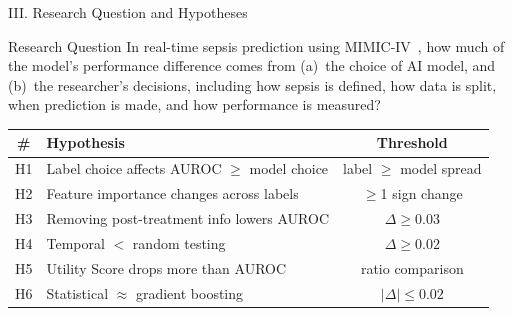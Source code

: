 \documentclass[aspectratio=169,10pt]{beamer}
\newcommand{\tablestyle}{%
  \renewcommand{\arraystretch}{1.2}%
  \small%
}
\begin{document}
\begin{frame}{III. Research Question and Hypotheses}
\begin{block}{Research Question}
  In real-time sepsis prediction using MIMIC-IV~\cite{johnson2023mimiciv}, how much of the model's performance difference comes from (a)~the choice of AI model, and (b)~the researcher's decisions, including how sepsis is defined, how data is split, when prediction is made, and how performance is measured?
\end{block}

\vspace{4pt}
\begin{center}
\tablestyle
\begin{tabular}{clc}
\toprule
\textbf{\#} & \textbf{Hypothesis} & \textbf{Threshold} \\
\midrule
H1 & Label choice affects AUROC $\geq$ model choice & label $\geq$ model spread \\
H2 & Feature importance changes across labels & $\geq$1 sign change \\
H3 & Removing post-treatment info lowers AUROC & $\Delta \geq 0.03$ \\
H4 & Temporal $<$ random testing & $\Delta \geq 0.02$ \\
H5 & Utility Score drops more than AUROC & ratio comparison \\
H6 & Statistical $\approx$ gradient boosting & $|\Delta| \leq 0.02$ \\
\bottomrule
\end{tabular}
\end{center}
\end{frame}
\end{document}
